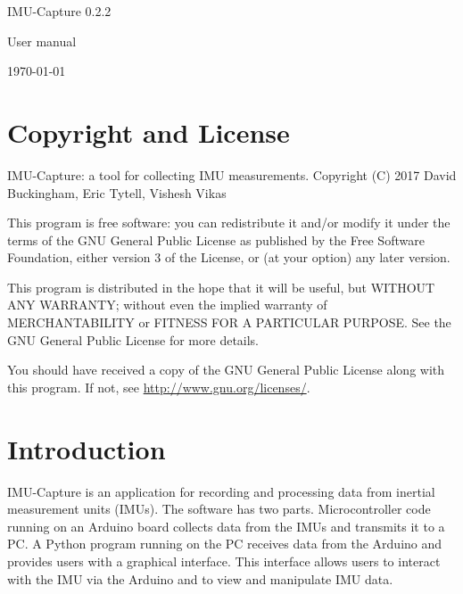 \documentclass[11pt,letterpaper,article,oneside]{memoir}
\newcommand{\name}{IMU-Capture}
\newcommand{\programVersion}{0.2.2}
\begin{document}
\thispagestyle{empty}

{%
\centering
\Large

\vspace*{\fill}

{\huge
\name{} \programVersion{}
}

{\LARGE
User manual
}

\today

\vspace*{\fill}

}

\cleardoublepage

\tableofcontents*

\clearpage




\chapter{Copyright and License}

\name{}: a tool for collecting IMU measurements.
Copyright (C) 2017 David Buckingham, Eric Tytell, Vishesh Vikas

This program is free software: you can redistribute it and/or modify
it under the terms of the GNU General Public License as published by
the Free Software Foundation, either version 3 of the License, or
(at your option) any later version.

This program is distributed in the hope that it will be useful,
but WITHOUT ANY WARRANTY; without even the implied warranty of
MERCHANTABILITY or FITNESS FOR A PARTICULAR PURPOSE.  See the
GNU General Public License for more details.

You should have received a copy of the GNU General Public License
along with this program.  If not, see \url{http://www.gnu.org/licenses/}.




\chapter{Introduction}

\name{} is an application for recording and processing data from inertial
measurement units (IMUs). The software has two parts. Microcontroller code
running on an Arduino board collects data from the IMUs and transmits it to a
PC. A Python program running on the PC receives data from the Arduino and
provides users with a graphical interface. This interface allows users to
interact with the IMU via the Arduino and to view and manipulate IMU data.
\end{document}
